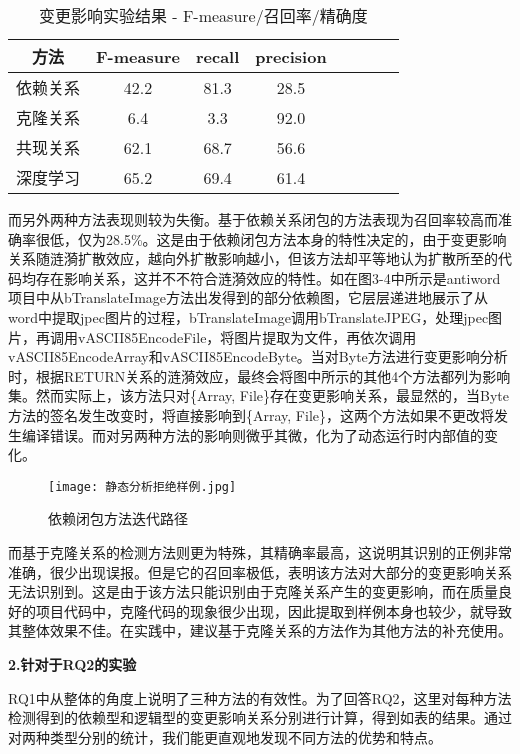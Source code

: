 \begin{table}[htbp]
\caption{变更影响实验结果 - F-measure/召回率/精确度}
\vspace{0.5em}\centering\wuhao
\begin{tabular}{cccccccc}
\toprule
方法 & F-measure & recall & precision  \\
\midrule
依赖关系 & 42.2 & 81.3 & 28.5  \\
克隆关系 & 6.4 & 3.3 &  92.0 \\
共现关系 & 62.1 & 68.7 & 56.6 \\
深度学习 & 65.2 & 69.4 & 61.4 \\
\bottomrule
\end{tabular}
\end{table}

而另外两种方法表现则较为失衡。基于依赖关系闭包的方法表现为召回率较高而准确率很低，仅为28.5\%。这是由于依赖闭包方法本身的特性决定的，由于变更影响关系随涟漪扩散效应，越向外扩散影响越小，但该方法却平等地认为扩散所至的代码均存在影响关系，这并不不符合涟漪效应的特性。如在图3-4中所示是antiword项目中从bTranslateImage方法出发得到的部分依赖图，它层层递进地展示了从word中提取jpec图片的过程，bTranslateImage调用bTranslateJPEG，处理jpec图片，再调用vASCII85EncodeFile，将图片提取为文件，再依次调用vASCII85EncodeArray和vASCII85EncodeByte。当对Byte方法进行变更影响分析时，根据RETURN关系的涟漪效应，最终会将图中所示的其他4个方法都列为影响集。然而实际上，该方法只对\{Array, File\}存在变更影响关系，最显然的，当Byte方法的签名发生改变时，将直接影响到\{Array, File\}，这两个方法如果不更改将发生编译错误。而对另两种方法的影响则微乎其微，化为了动态运行时内部值的变化。

\begin{figure}[h]
\centering
\texttt{[image: 静态分析拒绝样例.jpg]}
\caption{依赖闭包方法迭代路径}
\end{figure}

而基于克隆关系的检测方法则更为特殊，其精确率最高，这说明其识别的正例非常准确，很少出现误报。但是它的召回率极低，表明该方法对大部分的变更影响关系无法识别到。这是由于该方法只能识别由于克隆关系产生的变更影响，而在质量良好的项目代码中，克隆代码的现象很少出现，因此提取到样例本身也较少，就导致其整体效果不佳。在实践中，建议基于克隆关系的方法作为其他方法的补充使用。

\textbf{2.针对于RQ2的实验}

RQ1中从整体的角度上说明了三种方法的有效性。为了回答RQ2，这里对每种方法检测得到的依赖型和逻辑型的变更影响关系分别进行计算，得到如表的结果。通过对两种类型分别的统计，我们能更直观地发现不同方法的优势和特点。


